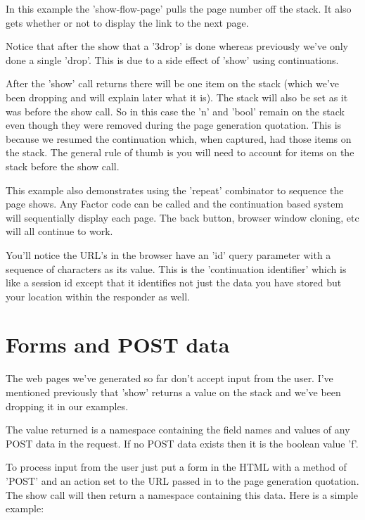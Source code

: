 In this example the 'show-flow-page' pulls the page number off the
stack. It also gets whether or not to display the link to the next
page.

Notice that after the show that a '3drop' is done whereas
previously we've only done a single 'drop'. This is due to a side
effect of 'show' using continuations. 

After the 'show' call returns there will be one item on the stack
(which we've been dropping and will explain later what it is). The
stack will also be set as it was before the show call. So in this case
the 'n' and 'bool' remain on the stack even though they were removed
during the page generation quotation. This is because we resumed the
continuation which, when captured, had those items on the stack. The
general rule of thumb is you will need to account for items on the
stack before the show call.

This example also demonstrates using the 'repeat' combinator to
sequence the page shows. Any Factor code can be called and the
continuation based system will sequentially display each page. The
back button, browser window cloning, etc will all continue to work.

You'll notice the URL's in the browser have an 'id' query parameter
with a sequence of characters as its value. This is the 'continuation
identifier' which is like a session id except that it identifies not
just the data you have stored but your location within the responder
as well.

\section{Forms and POST data}

The web pages we've generated so far don't accept input from the
user. I've mentioned previously that 'show' returns a value on the
stack and we've been dropping it in our examples. 

The value returned is a namespace containing the field names and
values of any POST data in the request. If no POST data exists then it
is the boolean value 'f'. 

To process input from the user just put a form in the HTML with a
method of 'POST' and an action set to the URL passed in to the page
generation quotation. The show call will then return a namespace
containing this data. Here is a simple example:

